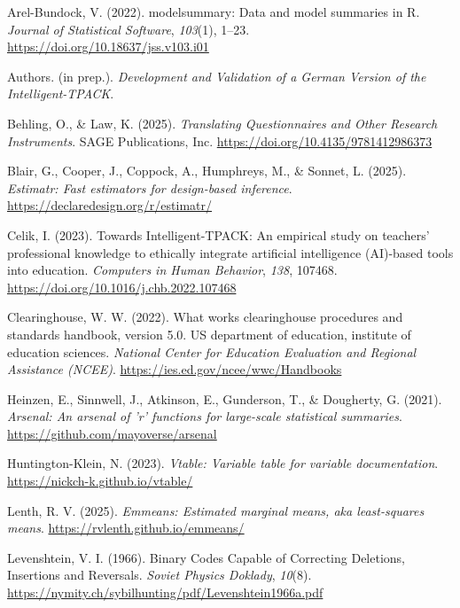\documentclass[
  letterpaper,
  DIV=11,
  numbers=noendperiod]{scrartcl}
\newlength{\cslhangindent}
\newenvironment{CSLReferences}[2] %
 {\begin{list}{}{%
  \setlength{\itemindent}{0pt}
  \setlength{\leftmargin}{0pt}
  \setlength{\parsep}{0pt}
  \ifodd #1
   \setlength{\leftmargin}{\cslhangindent}
   \setlength{\itemindent}{-1\cslhangindent}
  \fi
  \setlength{\itemsep}{#2\baselineskip}}}
 {\end{list}}
\begin{document}
\label{refs}
\begin{CSLReferences}{1}{0}
Arel-Bundock, V. (2022). {modelsummary}: Data and model summaries in
{R}. \emph{Journal of Statistical Software}, \emph{103}(1), 1--23.
\url{https://doi.org/10.18637/jss.v103.i01}

Authors. (in prep.). \emph{Development and {Validation} of a {German
Version} of the {Intelligent-TPACK}}.

Behling, O., \& Law, K. (2025). \emph{Translating {Questionnaires} and
{Other Research Instruments}}. SAGE Publications, Inc.
\url{https://doi.org/10.4135/9781412986373}

Blair, G., Cooper, J., Coppock, A., Humphreys, M., \& Sonnet, L. (2025).
\emph{Estimatr: Fast estimators for design-based inference}.
\url{https://declaredesign.org/r/estimatr/}

Celik, I. (2023). Towards {Intelligent-TPACK}: {An} empirical study on
teachers' professional knowledge to ethically integrate artificial
intelligence ({AI})-based tools into education. \emph{Computers in Human
Behavior}, \emph{138}, 107468.
\url{https://doi.org/10.1016/j.chb.2022.107468}

Clearinghouse, W. W. (2022). What works clearinghouse procedures and
standards handbook, version 5.0. US department of education, institute
of education sciences. \emph{National Center for Education Evaluation
and Regional Assistance (NCEE)}.
\url{https://ies.ed.gov/ncee/wwc/Handbooks}

Heinzen, E., Sinnwell, J., Atkinson, E., Gunderson, T., \& Dougherty, G.
(2021). \emph{Arsenal: An arsenal of 'r' functions for large-scale
statistical summaries}. \url{https://github.com/mayoverse/arsenal}

Huntington-Klein, N. (2023). \emph{Vtable: Variable table for variable
documentation}. \url{https://nickch-k.github.io/vtable/}

Lenth, R. V. (2025). \emph{Emmeans: Estimated marginal means, aka
least-squares means}. \url{https://rvlenth.github.io/emmeans/}

Levenshtein, V. I. (1966). Binary {Codes} {Capable} of {Correcting}
{Deletions}, {Insertions} and {Reversals}. \emph{Soviet Physics
Doklady}, \emph{10}(8).
\url{https://nymity.ch/sybilhunting/pdf/Levenshtein1966a.pdf}


\end{CSLReferences}
\end{document}
